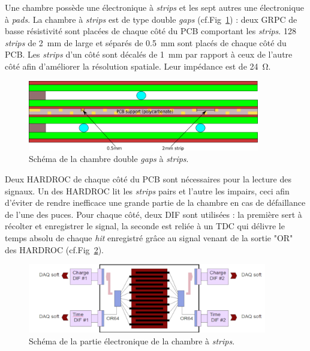 Une chambre possède une électronique à \textit{strips} et les sept autres une électronique à \textit{pads}. La chambre à \textit{strips} est de type double \textit{gaps} (cf.Fig~\ref{DoubleGap}) : deux GRPC de basse résistivité sont placées de chaque côté du PCB comportant les \textit{strips}. \num{128} \textit{strips} de \SI{2}{\milli\meter} de large et séparés de \SI{0.5}{\milli\meter} sont placés de chaque côté du PCB. Les \textit{strips} d'un côté sont décalés de \SI{1}{\milli\meter} par rapport à ceux de l'autre côté afin d'améliorer la résolution spatiale. Leur impédance est de \SI{24}{\ohm}. 

\begin{figure}[ht!]
	\centering
	\includegraphics[width=0.9\textwidth]{GLA/DoubleGap.png}
	\captionsetup{type=figure}\caption{Schéma de la chambre double \textit{gaps} à \textit{strips}.}
	\label{DoubleGap}
\end{figure}

Deux HARDROC de chaque côté du PCB sont nécessaires pour la lecture des signaux. Un des HARDROC lit les \textit{strips} pairs et l'autre les impairs, ceci afin d'éviter de rendre inefficace une grande partie de la chambre en cas de défaillance de l'une des puces. Pour chaque côté, deux DIF sont utilisées : la première sert à récolter et enregistrer le signal, la seconde est reliée à un TDC qui délivre le temps absolu de chaque \textit{hit} enregistré grâce au signal venant de la sortie "OR" des HARDROC (cf.Fig~\ref{SchemePS}).

\begin{figure}[ht!]
	\centering
	\includegraphics[width=0.93\textwidth]{GLA/SchemePS.png}
	\captionsetup{type=figure}\caption{Schéma de la partie électronique de la chambre à \textit{strips}.}
	\label{SchemePS}
\end{figure}

